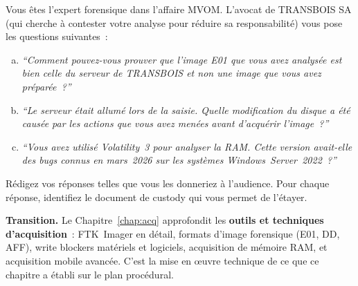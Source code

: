 \begin{boxexo}[title={\ding{45}\quad Exercice~8.3 --- Défense en contre-interrogatoire \niveauexpert}]
Vous êtes l'expert forensique dans l'affaire MVOM. L'avocat de TRANSBOIS SA
(qui cherche à contester votre analyse pour réduire sa responsabilité)
vous pose les questions suivantes~:
\begin{enumerate}[(a)]
    \item \textit{``Comment pouvez-vous prouver que l'image E01 que vous avez
          analysée est bien celle du serveur de TRANSBOIS et non une image
          que vous avez préparée~?''}
    \item \textit{``Le serveur était allumé lors de la saisie. Quelle
          modification du disque a été causée par les actions que vous avez
          menées avant d'acquérir l'image~?''}
    \item \textit{``Vous avez utilisé Volatility~3 pour analyser la RAM.
          Cette version avait-elle des bugs connus en mars~2026 sur les
          systèmes Windows~Server~2022~?''}
\end{enumerate}
Rédigez vos réponses telles que vous les donneriez à l'audience.
Pour chaque réponse, identifiez le document de custody qui vous permet
de l'étayer.
\end{boxexo}

\bigskip

\begin{boxinfo}
\textbf{Transition.} Le Chapitre~\ref{chap:acq} approfondit les
\textbf{outils et techniques d'acquisition}~: FTK~Imager en détail,
formats d'image forensique (E01, DD, AFF), write blockers matériels et
logiciels, acquisition de mémoire RAM, et acquisition mobile avancée.
C'est la mise en \oe uvre technique de ce que ce chapitre a établi
sur le plan procédural.
\end{boxinfo}